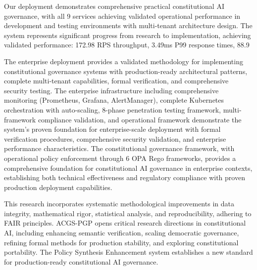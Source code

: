 \documentclass[manuscript,screen,9pt]{acmart}
\begin{document}
Our deployment demonstrates comprehensive practical constitutional AI governance, with all 9 services achieving validated operational performance in development and testing environments with multi-tenant architecture design. The system represents significant progress from research to implementation, achieving validated performance: 172.98 RPS throughput, 3.49ms P99 response times, 88.9%

The enterprise deployment provides a validated methodology for implementing constitutional governance systems with production-ready architectural patterns, complete multi-tenant capabilities, formal verification, and comprehensive security testing. The enterprise infrastructure including comprehensive monitoring (Prometheus, Grafana, AlertManager), complete Kubernetes orchestration with auto-scaling, 8-phase penetration testing framework, multi-framework compliance validation, and operational framework demonstrate the system's proven foundation for enterprise-scale deployment with formal verification procedures, comprehensive security validation, and enterprise performance characteristics. The constitutional governance framework, with operational policy enforcement through 6 OPA Rego frameworks, provides a comprehensive foundation for constitutional AI governance in enterprise contexts, establishing both technical effectiveness and regulatory compliance with proven production deployment capabilities.

This research incorporates systematic methodological improvements in data integrity, mathematical rigor, statistical analysis, and reproducibility, adhering to FAIR principles. ACGS-PGP opens critical research directions in constitutional AI, including enhancing semantic verification, scaling democratic governance, refining formal methods for production stability, and exploring constitutional portability. The Policy Synthesis Enhancement system establishes a new standard for production-ready constitutional AI governance.
\end{document}
